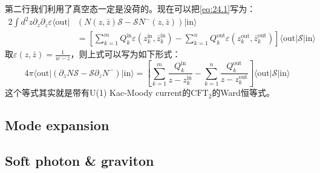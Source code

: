 第二行我们利用了真空态一定是没荷的。现在可以把\ref{eq:24.1}写为：
\begin{equation}
	\begin{aligned}
		2\int d^2z\partial_z\partial_{\bar{z}}\varepsilon\langle\text{out}|&\left(N(z,\bar{z})\mathcal{S}-\mathcal{S}N^-(z,\bar{z})\right)|\text{in}\rangle\\&=\left[\sum_{k=1}^mQ_k^\text{in}\varepsilon(z_k^\text{in},\bar{z}_k^\text{in})-\sum_{k=1}^nQ_k^\text{out}\varepsilon(z_k^\text{out},{\bar{z}}_k^\text{out})\right]\langle\text{out}|\mathcal{S}|\text{in}\rangle
	\end{aligned}
\end{equation}
取$\varepsilon(z,\bar z)=\frac{1}{w-z}$，则上式可以写为如下形式：
\begin{equation}
	4\pi\langle\mathrm{out}|\left(\partial_zN\mathcal{S}-\mathcal{S}\partial_zN^-\right)|\mathrm{in}\rangle=\left[\sum_{k=1}^m\frac{Q_k^\mathrm{in}}{z-z_k^\mathrm{in}}-\sum_{k=1}^n\frac{Q_k^\mathrm{out}}{z-z_k^\mathrm{out}}\right]\langle\mathrm{out}|\mathcal{S}|\mathrm{in}\rangle 
\end{equation}
这个等式其实就是带有U(1) Kac-Moody current的$\text{CFT}_2$的Ward恒等式\cite{Blumenhagen:2009zz,He:2015zea,Strominger:2013lka,Nande:2017dba}。
\subsection{Mode expansion}
\subsection{Soft photon \& graviton}